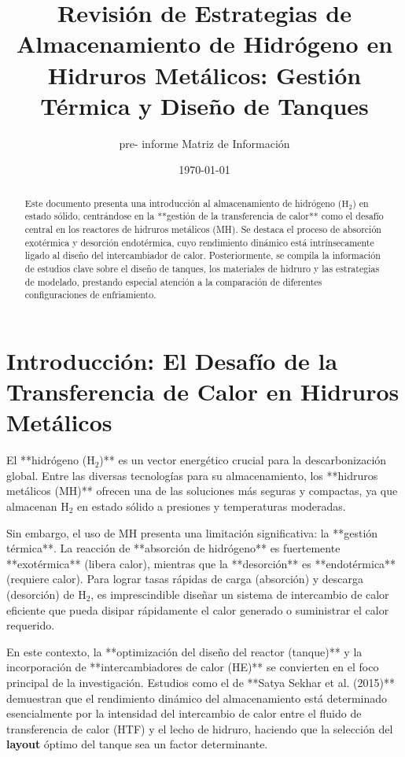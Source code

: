 \documentclass{article}
\title{Revisión de Estrategias de Almacenamiento de Hidrógeno en Hidruros Metálicos: Gestión Térmica y Diseño de Tanques}
\author{pre- informe  Matriz de Información}
\date{\today}
\begin{document}
\maketitle

\begin{abstract}
Este documento presenta una introducción al almacenamiento de hidrógeno ($\text{H}_2$) en estado sólido, centrándose en la **gestión de la transferencia de calor** como el desafío central en los reactores de hidruros metálicos (MH). Se destaca el proceso de absorción exotérmica y desorción endotérmica, cuyo rendimiento dinámico está intrínsecamente ligado al diseño del intercambiador de calor. Posteriormente, se compila la información de estudios clave sobre el diseño de tanques, los materiales de hidruro y las estrategias de modelado, prestando especial atención a la comparación de diferentes configuraciones de enfriamiento.
\end{abstract}

\section{Introducción: El Desafío de la Transferencia de Calor en Hidruros Metálicos}

El **hidrógeno ($\text{H}_2$)** es un vector energético crucial para la descarbonización global. Entre las diversas tecnologías para su almacenamiento, los **hidruros metálicos (MH)** ofrecen una de las soluciones más seguras y compactas, ya que almacenan $\text{H}_2$ en estado sólido a presiones y temperaturas moderadas.

Sin embargo, el uso de MH presenta una limitación significativa: la **gestión térmica**. La reacción de **absorción de hidrógeno** es fuertemente **exotérmica** (libera calor), mientras que la **desorción** es **endotérmica** (requiere calor). Para lograr tasas rápidas de carga (absorción) y descarga (desorción) de $\text{H}_2$, es imprescindible diseñar un sistema de intercambio de calor eficiente que pueda disipar rápidamente el calor generado o suministrar el calor requerido.

En este contexto, la **optimización del diseño del reactor (tanque)** y la incorporación de **intercambiadores de calor (HE)** se convierten en el foco principal de la investigación. Estudios como el de **Satya Sekhar et al. (2015)** demuestran que el rendimiento dinámico del almacenamiento está determinado esencialmente por la intensidad del intercambio de calor entre el fluido de transferencia de calor (HTF) y el lecho de hidruro, haciendo que la selección del \textbf{layout} óptimo del tanque sea un factor determinante.
\end{document}
